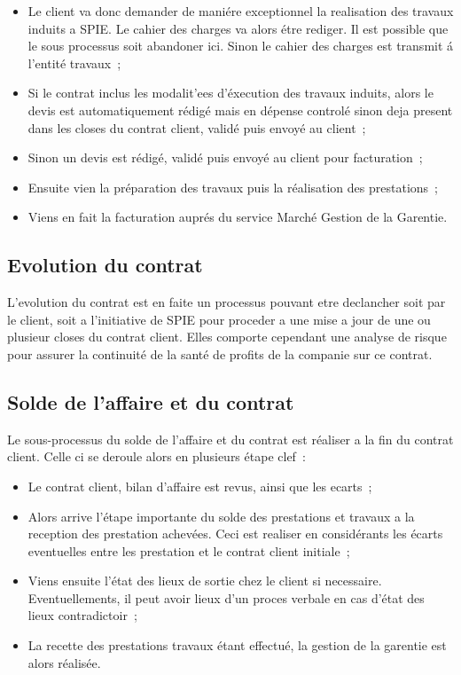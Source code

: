\begin{itemize}
    \item Le client va donc demander de mani\'ere exceptionnel la realisation des travaux induits a
    SPIE. Le cahier des charges va alors \'etre rediger. Il est possible que le sous processus soit
    abandoner ici. Sinon le cahier des charges est transmit \'a l'entit\'e travaux~;
    \item Si le contrat inclus les modalit'ees d'\'execution des travaux induits, alors le devis est
    automatiquement r\'edig\'e mais en d\'epense control\'e sinon deja present dans les closes du
    contrat client, valid\'e puis envoy\'e au client~;
    \item Sinon un devis est r\'edig\'e, valid\'e puis envoy\'e au client pour facturation~;
    \item Ensuite vien la pr\'eparation des travaux puis la r\'ealisation des prestations~;
    \item Viens en fait la facturation aupr\'es du service March\'e Gestion de la Garentie.
\end{itemize}

\subsection{Evolution du contrat}

L'evolution du contrat  est en faite un processus pouvant etre declancher soit par le client, soit
a l'initiative de SPIE pour proceder a une mise a jour de une ou plusieur closes du contrat client.
Elles comporte cependant une analyse de risque pour assurer la continuit\'e de la sant\'e de profits
de la companie sur ce contrat.


\subsection{Solde de l'affaire et du contrat}

Le sous-processus du solde de l'affaire et du contrat est r\'ealiser a la fin du contrat client. Celle
ci se deroule alors en plusieurs \'etape clef~:

\begin{itemize}
    \item Le contrat client, bilan d'affaire est revus, ainsi que les ecarts~;
    \item Alors arrive l'\'etape importante du solde des prestations et travaux a la reception des
    prestation achev\'ees. Ceci est realiser en consid\'erants les \'ecarts eventuelles entre les
    prestation et le contrat client initiale~;
    \item Viens ensuite l'\'etat des lieux de sortie chez le client si necessaire. Eventuellements,
    il peut avoir lieux d'un proces verbale en cas d'\'etat des lieux contradictoir~;
    \item La recette des prestations travaux \'etant effectu\'e, la gestion de la garentie est alors
    r\'ealis\'ee.
\end{itemize}


